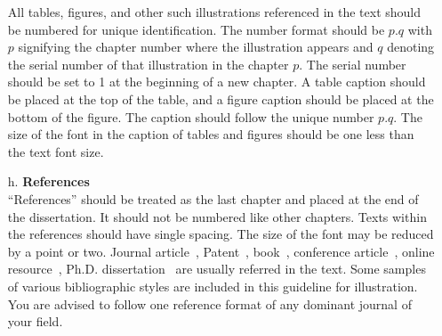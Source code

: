 \begin{itemize}
All tables, figures, and other such illustrations referenced in the text should be numbered for unique identification. The number format should be $p.q$ with $p$ signifying the chapter number where the illustration appears and $q$ denoting the serial number of that illustration in the chapter $p$. The serial number should be set to 1 at the beginning of a new chapter. A table caption should be placed at the top of the table, and a figure caption should be placed at the bottom of the figure. The caption should follow the unique number $p.q$. The size of the font in the caption of tables and figures should be one less than the text font size. 
\item [h.] \textbf{References}\\
``References'' should be treated as the last chapter and placed at the end of the dissertation. It should not be numbered like other chapters. Texts within the references should have single spacing. The size of the font may be reduced by a point or two. Journal article~\cite{Shannon,Lowe}, Patent~\cite{BulbE,ViBEpatent}, book~\cite{p00e,Vapnik}, conference article~\cite{Toyama,icra}, online resource~\cite{nasa,Kodak}, Ph.D. dissertation~\cite{Sutherland,Dhawan} are usually referred in the text. Some samples of various bibliographic styles are included in this guideline for illustration. You are advised to follow one reference format of any dominant journal of your field.
\end{itemize}

